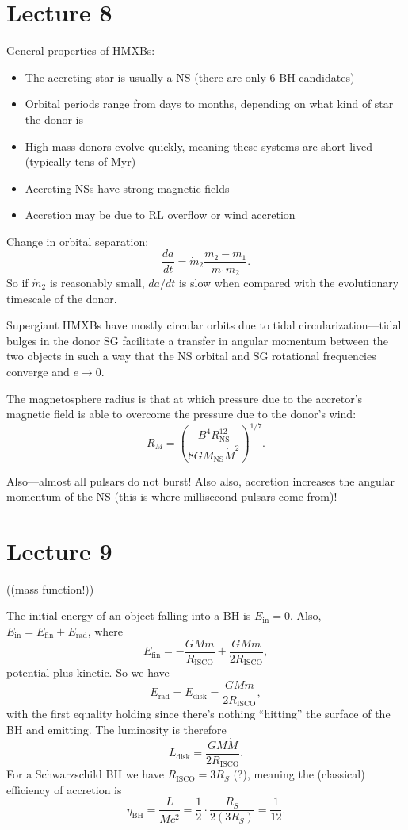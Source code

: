 \documentclass[../a122main.tex]{subfiles}
\begin{document}
\section{Lecture 8}
General properties of HMXBs:
\begin{itemize}[topsep=0pt]
    \item The accreting star is usually a NS (there are only 6 BH candidates)
    \item Orbital periods range from days to months, depending on what kind of star the donor is
    \item High-mass donors evolve quickly, meaning these systems are short-lived (typically tens of Myr)
    \item Accreting NSs have strong magnetic fields
    \item Accretion may be due to RL overflow or wind accretion
\end{itemize}
Change in orbital separation:
\[ \frac{da}{dt} = \dot m_2 \frac{m_2 - m_1}{m_1 m_2}. \]
So if $\dot m_2$ is reasonably small, $da / dt$ is slow when compared with the evolutionary timescale of the donor.


Supergiant HMXBs have mostly circular orbits due to tidal circularization---tidal bulges in the donor SG facilitate a transfer in angular momentum between the two objects in such a way that the NS orbital and SG rotational frequencies converge and $e \to 0$.


The magnetosphere radius is that at which pressure due to the accretor's magnetic field is able to overcome the pressure due to the donor's wind:
\[ R_M = \left( \frac{B^{4} R_\text{NS}^{12}}{8G M_\text{NS} \dot M^2} \right)^{1 / 7}. \]

Also---almost all pulsars do not burst!
Also also, accretion increases the angular momentum of the NS (this is where millisecond pulsars come from)!

\section{Lecture 9}

((mass function!))

The initial energy of an object falling into a BH is $E_\textrm{in} = 0$.
Also, $E_\textrm{in} = E_\textrm{fin} + E_\textrm{rad}$, where
\[ E_\textrm{fin} = -\frac{GMm}{R_\textrm{ISCO}} + \frac{GMm}{2R_\textrm{ISCO}}, \]
potential plus kinetic.
So we have
\[ E_\textrm{rad} = E_\textrm{disk} = \frac{GMm}{2R_\textrm{ISCO}}, \]
with the first equality holding since there's nothing ``hitting'' the surface of the BH and emitting.
The luminosity is therefore
\[ L_\textrm{disk} = \frac{GM \dot M}{2R_\textrm{ISCO}}. \]
For a Schwarzschild BH we have $R_\textrm{ISCO} = 3R_S$ (?), meaning the (classical) efficiency of accretion is
\[ \eta_\textrm{BH} = \frac{L}{\dot M c^2} = \frac{1}{2} \cdot \frac{R_S}{2 (3R_S)} = \frac{1}{12}. \]
\end{document}
